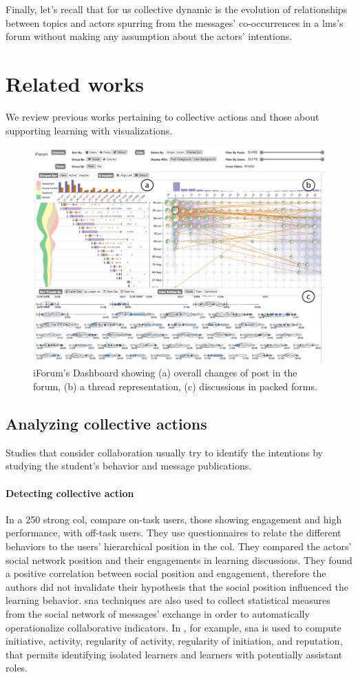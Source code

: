 \documentclass[a4paper,twoside]{article}
\begin{document}

Finally, let's recall that for us collective dynamic is the evolution of relationships between topics and actors spurring from the messages' co-occurrences in a \gls{lms}'s forum without making any assumption about the actors' intentions.

\section{Related works}
\label{section:3}
We review previous works pertaining to collective actions and those about supporting learning with visualizations.


\begin{figure}[b]
 \small{
  \caption{\label{fig:fu}
    iForum's Dashboard \citep{Fu2017} showing (a) overall changes of post in the forum, (b) a thread representation, (c) discussions in packed forms.
  }}
 \centering
 \includegraphics[width=.5\textwidth]{images/fu.png}
\end{figure}


\subsection{Analyzing collective actions}
Studies that consider collaboration usually try to identify the intentions by studying the student's behavior and message publications.


\paragraph{Detecting collective action} In a 250 strong \gls{col}, \cite{Rehm2015} compare on-task users, those showing engagement and high performance, with off-task users.  They use questionnaires to relate the different behaviors to the users' hierarchical position in the \gls{col}.  They compared the actors' social network position and their engagements in learning discussions.  They found a positive correlation between social position and engagement, therefore the authors did not invalidate their hypothesis that the social position influenced the learning behavior.
\gls{sna} techniques are also used to collect statistical measures from the social network of messages' exchange in order to automatically operationalize collaborative indicators.  In \citep{Lobo2016}, for example, \gls{sna} is used to compute initiative, activity, regularity of activity, regularity of initiation, and reputation, that permits identifying isolated learners and learners with potentially assistant roles.
\end{document}
